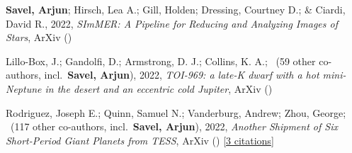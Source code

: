 \item[{\color{numcolor}\scriptsize3}] \textbf{Savel, Arjun}; Hirsch, Lea A.; Gill, Holden; Dressing, Courtney D.; \& Ciardi, David R., 2022, \emph{SImMER: A Pipeline for Reducing and Analyzing Images of Stars}, ArXiv ()

\item[{\color{numcolor}\scriptsize2}] Lillo-Box, J.; Gandolfi, D.; Armstrong, D. J.; Collins, K. A.; \etal\ ({59} other co-authors, incl.\ \textbf{Savel, Arjun}), 2022, \emph{TOI-969: a late-K dwarf with a hot mini-Neptune in the desert and an eccentric cold Jupiter}, ArXiv ()

\item[{\color{numcolor}\scriptsize1}] Rodriguez, Joseph E.; Quinn, Samuel N.; Vanderburg, Andrew; Zhou, George; \etal\ ({117} other co-authors, incl.\ \textbf{Savel, Arjun}), 2022, \emph{Another Shipment of Six Short-Period Giant Planets from TESS}, ArXiv () [\href{https://ui.adsabs.harvard.edu/abs/2022arXiv220505709R}{3 citations}]